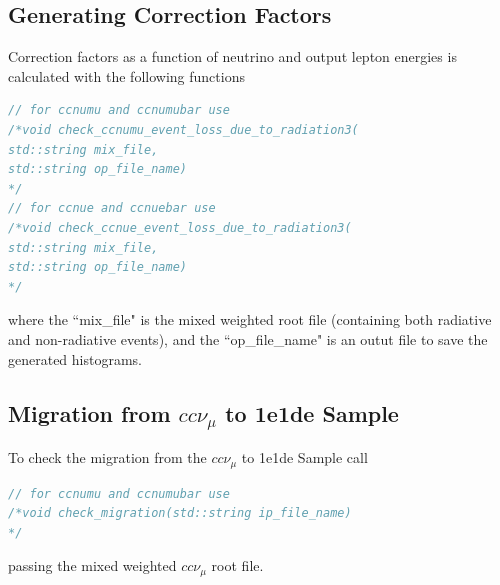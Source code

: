 \documentclass[12pt]{article}
\newcommand{\comment}[1]{}
\begin{document}
\subsection{Generating Correction Factors}
Correction factors as a function of neutrino and output lepton energies is calculated with the following functions
\begin{lstlisting}[language=C++, caption= Generating Correction Factors]
// for ccnumu and ccnumubar use
/*void check_ccnumu_event_loss_due_to_radiation3(
std::string mix_file,
std::string op_file_name)
*/
// for ccnue and ccnuebar use
/*void check_ccnue_event_loss_due_to_radiation3(
std::string mix_file,
std::string op_file_name)
*/
\end{lstlisting}
where the ``mix\_file" is the mixed weighted root file (containing both radiative and non-radiative events), and the ``op\_file\_name" is an outut file to save the generated histograms. 
\subsection{Migration from $cc\nu_\mu$ to 1e1de Sample}
To check the migration from the $cc\nu_\mu$ to 1e1de Sample call
\begin{lstlisting}[language=C++, caption= Migration Check]
// for ccnumu and ccnumubar use
/*void check_migration(std::string ip_file_name)
*/
\end{lstlisting}
passing the mixed weighted $cc\nu_\mu$ root file.
\comment{
\begin{thebibliography}{9}
	\bibitem{Ko_phd} 
	Konosuke Iwamoto. 
	\textit{Neutrino Oscillation Measurements with An Expanded Electron Neutrino Appearance Sample in T2K, 2017.}
	
	\bibitem{Kevin_talk1} 
	Kevin McFarland and Konosuke Iwamoto.
	\textit{Radiative CCQE and T2k's Oscillation Analyses, 2018}
	
	\bibitem{Rujula_calc}
	A. De Rujula, R. Petronzio and A. Savoy-Navarro
	\textit{Radiative Corrections to High-Energy Neutrino Scattering. Nucl.Phys. B154 (1979) 394. CERN-TH-2593.}
	
\end{thebibliography}
}	
\end{document}

